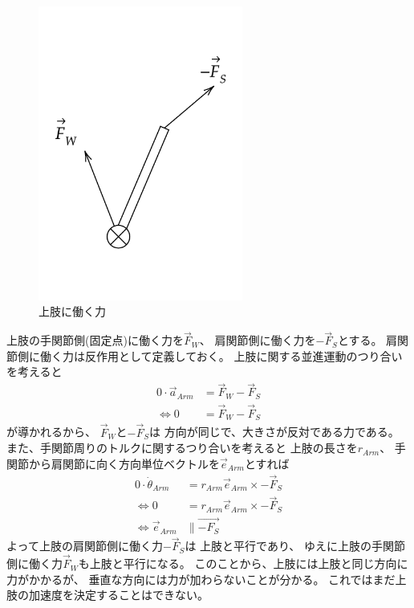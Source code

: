 \documentclass[a4paper,11pt]{jsarticle}
\begin{document}
\begin{figure}[h]
  \centering
  \includegraphics[width = 0.6\textwidth]{F_arm_config.png}
  \caption{上肢に働く力}
  \label{F_arm_config.png}
\end{figure}

上肢の手関節側(固定点)に働く力を$\vec{F}_W$、
肩関節側に働く力を$-\vec{F}_S$とする。
肩関節側に働く力は反作用として定義しておく。
上肢に関する並進運動のつり合いを考えると
\begin{align*}
  0 \cdot \vec{a}_{Arm} &= \vec{F}_W - \vec{F}_S
  \\
  \Leftrightarrow
  0 &= \vec{F}_W - \vec{F}_S
\end{align*}
が導かれるから、
$\vec{F}_W$と$-\vec{F}_S$は
方向が同じで、大きさが反対である力である。
また、手関節周りのトルクに関するつり合いを考えると
上肢の長さを$r_{Arm}$、
手関節から肩関節に向く方向単位ベクトルを$\vec{e}_{Arm}$とすれば
\begin{align*}
  0 \cdot \dot\theta_{Arm} &= r_{Arm} \vec{e}_{Arm} \times -\vec{F}_S
  \\
  \Leftrightarrow
  0 &= r_{Arm} \vec{e}_{Arm} \times -\vec{F}_S
  \\
  \Leftrightarrow
  \vec{e}_{Arm} &\parallel \vec{-F_S}
\end{align*}
よって上肢の肩関節側に働く力$-\vec{F}_S$は
上肢と平行であり、
ゆえに上肢の手関節側に働く力$\vec{F}_W$も上肢と平行になる。
このことから、上肢には上肢と同じ方向に力がかかるが、
垂直な方向には力が加わらないことが分かる。
これではまだ上肢の加速度を決定することはできない。
\end{document}
